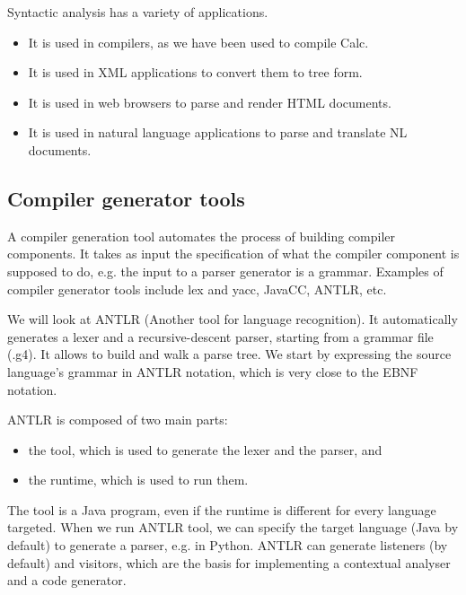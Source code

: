 \documentclass[a4paper, openany]{memoir}
\begin{document}
Syntactic analysis has a variety of applications.
\begin{itemize}
    \item It is used in compilers, as we have been used to compile Calc.
    \item It is used in XML applications to convert them to tree form.
    \item It is used in web browsers to parse and render HTML documents.
    \item It is used in natural language applications to parse and translate NL documents.
\end{itemize}

\subsection{Compiler generator tools}
A compiler generation tool automates the process of building compiler components. It takes as input the specification of what the compiler component is supposed to do, e.g. the input to a parser generator is a grammar. Examples of compiler generator tools include lex and yacc, JavaCC, ANTLR, etc.

We will look at ANTLR (Another tool for language recognition). It automatically generates a lexer and a recursive-descent parser, starting from a grammar file (.g4). It allows to build and walk a parse tree. We start by expressing the source language's grammar in ANTLR notation, which is very close to the EBNF notation.

ANTLR is composed of two main parts:
\begin{itemize}
    \item the tool, which is used to generate the lexer and the parser, and
    \item the runtime, which is used to run them.
\end{itemize}
The tool is a Java program, even if the runtime is different for every language targeted. When we run ANTLR tool, we can specify the target language (Java by default) to generate a parser, e.g. in Python. ANTLR can generate listeners (by default) and visitors, which are the basis for implementing a contextual analyser and a code generator.
\end{document}
